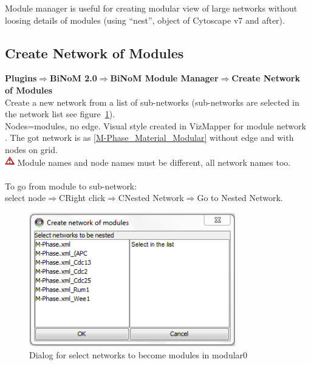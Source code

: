 Module manager is useful for creating modular view of large networks without loosing details of modules (using “nest”, object of Cytoscape v7 and after).

\subsection{Create Network of Modules}
\textbf{Plugins$\Rightarrow$BiNoM 2.0$\Rightarrow$BiNoM Module Manager$\Rightarrow$Create Network of Modules}\\
Create a new network from a list of sub-networks (sub-networks are selected in the network list see figure~\ref{Create_network_of_modules}).\\
Nodes=modules, no edge. Visual style created in VizMapper for module network . The got network is as \ref{M-Phase_Material_Modular} without edge and with nodes on grid.\\
\includegraphics[width=12pt,height=12pt]{graphics/warning} Module names and node names must be different, all network names too.\\\\
To go from module to sub-network:\\
select node$\Rightarrow$CRight click$\Rightarrow$CNested Network$\Rightarrow$Go to Nested Network.
\begin{figure}
\centering
\includegraphics[width=0.8\textwidth]{graphics/Create_network_of_modules}
\caption{Dialog for select networks to become modules in modular0}
\label{Create_network_of_modules}
\end{figure}

